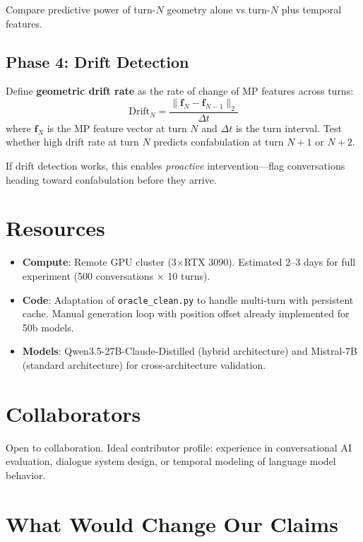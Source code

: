 \documentclass[11pt,letterpaper]{article}
\begin{document}
\noindent Compare predictive power of turn-$N$ geometry alone vs
turn-$N$ plus temporal features.

\subsection{Phase 4: Drift Detection}

Define \textbf{geometric drift rate} as the rate of change of MP
features across turns:
\[
  \text{Drift}_N = \frac{\|\mathbf{f}_{N} - \mathbf{f}_{N-1}\|_2}{\Delta t}
\]
where $\mathbf{f}_N$ is the MP feature vector at turn $N$ and
$\Delta t$ is the turn interval. Test whether high drift rate at turn
$N$ predicts confabulation at turn $N+1$ or $N+2$.

If drift detection works, this enables \emph{proactive}
intervention---flag conversations heading toward confabulation before
they arrive.

\section{Resources}

\begin{itemize}
  \item \textbf{Compute}: Remote GPU cluster (3$\times$RTX 3090). Estimated 2--3
    days for full experiment (500 conversations $\times$ 10 turns).
  \item \textbf{Code}: Adaptation of \texttt{oracle\_clean.py} to
    handle multi-turn with persistent cache. Manual generation loop
    with position offset already implemented for 50b models.
  \item \textbf{Models}: Qwen3.5-27B-Claude-Distilled (hybrid
    architecture) and Mistral-7B (standard architecture) for
    cross-architecture validation.
\end{itemize}

\section{Collaborators}

Open to collaboration. Ideal contributor profile: experience in
conversational AI evaluation, dialogue system design, or temporal
modeling of language model behavior.

\section{What Would Change Our Claims}
\end{document}
